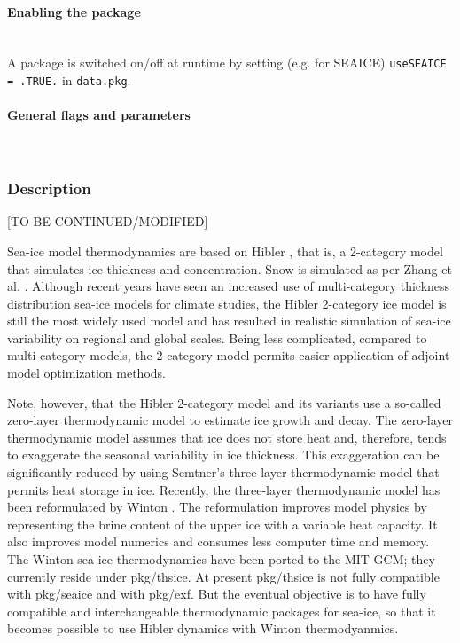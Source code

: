 \paragraph{Enabling the package}
~ \\
%
A package is switched on/off at runtime by setting
(e.g. for SEAICE) \texttt{useSEAICE = .TRUE.} in \texttt{data.pkg}.

\paragraph{General flags and parameters}
~ \\
%




\subsubsection{Description
\label{sec:pkg:seaice:descr}}

[TO BE CONTINUED/MODIFIED]

Sea-ice model thermodynamics are based on Hibler
\cite{hib80}, that is, a 2-category model that simulates ice thickness
and concentration.  Snow is simulated as per Zhang et al.
\cite{zha98a}.  Although recent years have seen an increased use of
multi-category thickness distribution sea-ice models for climate
studies, the Hibler 2-category ice model is still the most widely used
model and has resulted in realistic simulation of sea-ice variability
on regional and global scales.  Being less complicated, compared to
multi-category models, the 2-category model permits easier application
of adjoint model optimization methods.

Note, however, that the Hibler 2-category model and its variants use a
so-called zero-layer thermodynamic model to estimate ice growth and
decay.  The zero-layer thermodynamic model assumes that ice does not
store heat and, therefore, tends to exaggerate the seasonal
variability in ice thickness.  This exaggeration can be significantly
reduced by using Semtner's \cite{sem76} three-layer thermodynamic
model that permits heat storage in ice.  Recently, the three-layer
thermodynamic model has been reformulated by Winton \cite{win00}.  The
reformulation improves model physics by representing the brine content
of the upper ice with a variable heat capacity.  It also improves
model numerics and consumes less computer time and memory.  The Winton
sea-ice thermodynamics have been ported to the MIT GCM; they currently
reside under pkg/thsice.  At present pkg/thsice is not fully
compatible with pkg/seaice and with pkg/exf.  But the eventual
objective is to have fully compatible and interchangeable
thermodynamic packages for sea-ice, so that it becomes possible to use
Hibler dynamics with Winton thermodyanmics.

